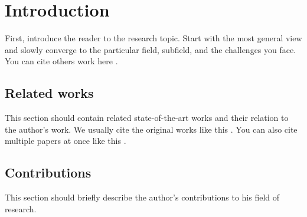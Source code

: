 \chapter{Introduction}


First, introduce the reader to the research topic.
Start with the most general view and slowly converge to the particular field, subfield, and the challenges you face.
You can cite others work here \cite{baca2020mrs}.

\section{Related works}

This section should contain related state-of-the-art works and their relation to the author's work.
We usually cite the original works like this \cite{benallegue2008high}.
You can also cite multiple papers at once like this \cite{baca2016embedded, baca2020mrs}.

\section{Contributions}

This section should briefly describe the author's contributions to his field of research.
